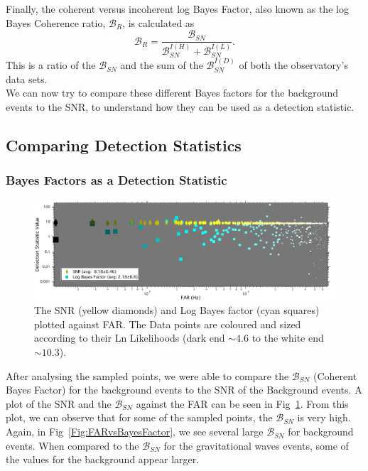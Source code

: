 \documentclass{article}
\begin{document}
Finally, the coherent versus incoherent log Bayes Factor, also known as the log Bayes Coherence ratio, $\mathcal{B}_{R}$,  is calculated as 
 \begin{equation}\label{eq:BCR}
 \mathcal{B}_{R} = \frac{\mathcal{B}_{SN}}{\mathcal{B}_{SN}^{I(H)}+\mathcal{B}_{SN}^{I(L)}}.
 \end{equation}
This is a ratio of the $\mathcal{B}_{SN}$ and the sum of the $\mathcal{B}_{SN}^{I(D)}$ of both the observatory's data sets.\\

We can now try to compare these different Bayes factors for the background events to the SNR, to understand how they can be used as a detection statistic. \\



\subsection{Comparing Detection Statistics}
\label{section:Comparing Detection Statistics}
        
 \subsubsection{Bayes Factors as a Detection Statistic}
 
          \begin{figure}[h]
          	\centering
          	\includegraphics[width=1\textwidth]{Figures/DetectionStatVSfar_bF.pdf} 
          	\caption{The SNR (yellow diamonds) and Log Bayes factor (cyan squares) plotted against FAR. The Data points are coloured and sized according to their Ln Likelihoods (dark end $\sim4.6 $ to the white end $\sim10.3$).}
          	\label{Fig:BayesVSFAR}
          \end{figure}
         
   
 
 After analysing the sampled points, we were able to compare the $\mathcal{B}_{SN}$ (Coherent Bayes Factor) for the background events to the SNR of the Background events. A plot of the SNR and the $\mathcal{B}_{SN}$ against the FAR can be seen in Fig~\ref{Fig:BayesVSFAR}. From this plot, we can observe that for some of the sampled points, the $\mathcal{B}_{SN}$ is very high. Again, in Fig~\ref{Fig:FARvsBayesFactor}, we see several large $\mathcal{B}_{SN}$ for background events. When compared to the $\mathcal{B}_{SN}$ for the gravitational waves events, some of the values for the background appear larger. \\
 
\end{document}
